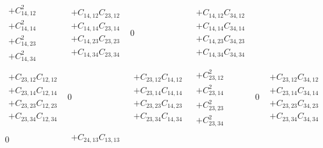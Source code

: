 \documentclass[pra,nofootinbib]{revtex4-1}
\newcommand{\C}[2]{C_{{#1},{#2}}}
\begin{document}
\begin{eqnarray}
\begin{array}{cccccc}
\begin{array}{c}
     + \C{14}{12}^2 \\
     + \C{14}{14}^2 \\
     + \C{14}{23}^2 \\
     + \C{14}{34}^2 
     \end{array} &
     \begin{array}{c}
     + \C{14}{12}\C{23}{12} \\
     + \C{14}{14}\C{23}{14} \\
     + \C{14}{23}\C{23}{23} \\
     + \C{14}{34}\C{23}{34} 
     \end{array} &
     0 &
     \begin{array}{c}
     + \C{14}{12}\C{34}{12} \\
     + \C{14}{14}\C{34}{14} \\
     + \C{14}{23}\C{34}{23} \\
     + \C{14}{34}\C{34}{34}
     \end{array} \\
     \begin{array}{c}
     + \C{23}{12}\C{12}{12} \\
     + \C{23}{14}\C{12}{14} \\
     + \C{23}{23}\C{12}{23} \\
     + \C{23}{34}\C{12}{34} 
     \end{array} &
     0 &
     \begin{array}{c}
     + \C{23}{12}\C{14}{12} \\
     + \C{23}{14}\C{14}{14} \\
     + \C{23}{23}\C{14}{23} \\
     + \C{23}{34}\C{14}{34}
     \end{array} &
     \begin{array}{c}
     + \C{23}{12}^2 \\
     + \C{23}{14}^2 \\
     + \C{23}{23}^2 \\
     + \C{23}{34}^2
     \end{array} &
     0 &
     \begin{array}{c}
     + \C{23}{12}\C{34}{12} \\
     + \C{23}{14}\C{34}{14} \\
     + \C{23}{23}\C{34}{23} \\
     + \C{23}{34}\C{34}{34}
     \end{array} \\
     0 &
     \begin{array}{c}
     + \C{24}{13}\C{13}{13} \\

\end{array}
\end{array}
\end{eqnarray}
\end{document}
